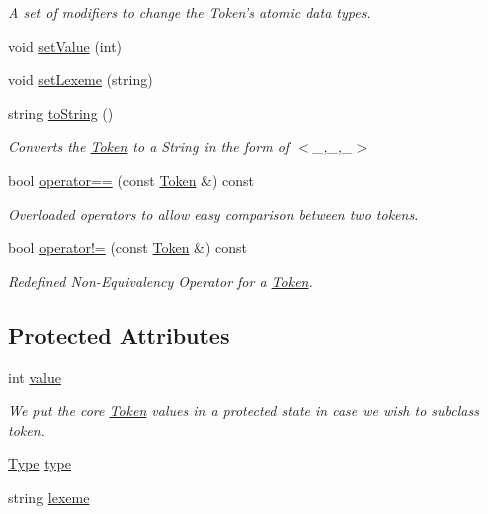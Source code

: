 \begin{DoxyCompactItemize}
\begin{DoxyCompactList}\small\item\em A set of modifiers to change the Token's atomic data types. \end{DoxyCompactList}\item 
void \hyperlink{classToken_ab015619f67bf97abb8d00a9037cafd49}{setValue} (int)
\item 
void \hyperlink{classToken_aed8a3626e2ef382587f66befa0f5761f}{setLexeme} (string)
\item 
string \hyperlink{classToken_a4e0ca338277bccb0f820f5149e82af79}{toString} ()
\begin{DoxyCompactList}\small\item\em Converts the \hyperlink{classToken}{Token} to a String in the form of $<$\_\-,\_\-,\_\-$>$ \end{DoxyCompactList}\item 
bool \hyperlink{classToken_afefbe9d487b40b055403fa2c41004d99}{operator==} (const \hyperlink{classToken}{Token} \&) const 
\begin{DoxyCompactList}\small\item\em Overloaded operators to allow easy comparison between two tokens. \end{DoxyCompactList}\item 
bool \hyperlink{classToken_a2f5a82fe3f636917336cc5171f4f53c2}{operator!=} (const \hyperlink{classToken}{Token} \&) const 
\begin{DoxyCompactList}\small\item\em Redefined Non-\/Equivalency Operator for a \hyperlink{classToken}{Token}. \end{DoxyCompactList}\end{DoxyCompactItemize}
\subsection*{Protected Attributes}
\begin{DoxyCompactItemize}
\item 
int \hyperlink{classToken_a041346a45c6c5571a78a6af3394a2756}{value}
\begin{DoxyCompactList}\small\item\em We put the core \hyperlink{classToken}{Token} values in a protected state in case we wish to subclass token. \end{DoxyCompactList}\item 
\hyperlink{token_8h_a1d1cfd8ffb84e947f82999c682b666a7}{Type} \hyperlink{classToken_a7e5e6513d379ca2e388273b23ea1ba4a}{type}
\item 
string \hyperlink{classToken_af4c57a4ede01f2040ea4927141f5a661}{lexeme}
\end{DoxyCompactItemize}



